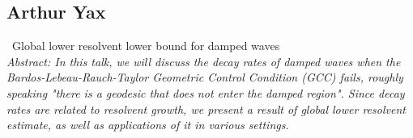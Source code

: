 \documentclass[12pt,a4paper]{amsart}
\begin{document}
\bigskip

\subsection*{Arthur Yax} \, Global lower resolvent lower bound for damped waves \smallskip \\
\textit{Abstract: In this talk, we will discuss the decay rates of damped waves when the Bardos-Lebeau-Rauch-Taylor Geometric Control Condition (GCC) fails, roughly speaking "there is a geodesic that does not enter the damped region".
Since decay rates are related to resolvent growth, we  present a result of global lower resolvent estimate, as well as applications of it in various settings.}
\end{document}
